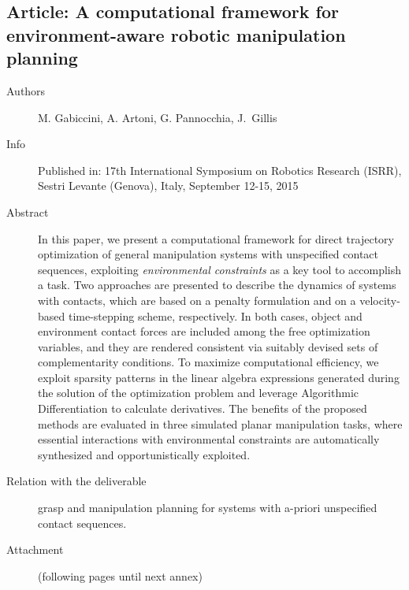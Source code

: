 \documentclass[a4paper,11pt,pdf]{pacmanreport}
\begin{document}

\subsection{Article: A computational framework for environment-aware robotic manipulation planning} \label{ann:env-awareManipulation}
\begin{description}
    \item[Authors] M. Gabiccini, A. Artoni, G. Pannocchia, J.~Gillis
    \item[Info] Published in: 17th International Symposium on Robotics Research (ISRR), Sestri Levante (Genova), Italy, September 12-15, 2015
    \item[Abstract] In this paper, we present a computational framework for direct trajectory optimization of general manipulation systems with unspecified contact sequences, exploiting \emph{environmental constraints} as a key tool to accomplish a task.
    Two approaches are presented to describe the dynamics of systems with contacts, which are based on a penalty formulation and on a velocity-based time-stepping scheme, respectively. In  both cases, object and environment contact forces are included among the free optimization variables, and they are rendered consistent via suitably devised sets of complementarity conditions.
    To maximize computational efficiency, we exploit sparsity patterns in the linear algebra expressions generated during the solution of the optimization problem and leverage Algorithmic Differentiation to calculate derivatives. %
    The benefits of the proposed methods are evaluated in three simulated planar manipulation tasks, where essential interactions with environmental constraints are automatically synthesized and opportunistically exploited.
    \item[Relation with the deliverable] grasp and manipulation planning for systems with a-priori unspecified contact sequences.
    \item[Attachment] (following pages until next annex)
\end{description}

%

\end{document}
